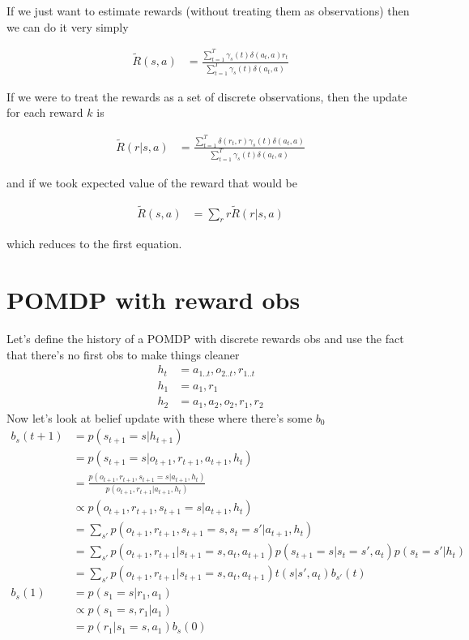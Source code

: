 \documentclass[10pt,english]{article}
\begin{document}
If we just want to estimate rewards (without treating them as observations) then we can do it very simply

\begin{align}
\tilde{R}(s,a) &= \frac{\sum_{t=1}^{T}\gamma_{s}(t)\delta(a_t,a) r_t}{\sum_{t=1}^{T}\gamma_{s}(t)\delta(a_t,a)}
\end{align}

If we were to treat the rewards as a set of discrete observations, then the update for each reward $k$ is

\begin{align}
\tilde{R}(r|s,a) &= \frac{\sum_{t=1}^{T}\delta(r_t,r) \gamma_{s}(t)\delta(a_t,a)}{\sum_{t=1}^{T}\gamma_{s}(t)\delta(a_t,a)}
\end{align}

and if we took expected value of the reward that would be

\begin{align}
\tilde{R}(s,a) &= \sum_r r\tilde{R}(r|s,a)
\end{align}

which reduces to the first equation.

\section{POMDP with reward obs}

Let's define the history of a POMDP with discrete rewards obs and use the fact that there's no first obs to make things cleaner
\begin{align}
h_t &= a_{1..t},o_{2..t},r_{1..t} \\
h_1 &= a_1,r_1 \\
h_2 &= a_1,a_2,o_2,r_1,r_2
\end{align}
Now let's look at belief update with these where there's some $b_0$
\begin{align}
b_s(t+1) &= p(s_{t+1}=s|h_{t+1}) \\
&= p(s_{t+1}=s|o_{t+1},r_{t+1},a_{t+1},h_{t}) \\
&= \frac{p(o_{t+1},r_{t+1},s_{t+1}=s|a_{t+1},h_{t})}{p(o_{t+1},r_{t+1}|a_{t+1},h_{t})} \\
&\propto {p(o_{t+1},r_{t+1},s_{t+1}=s|a_{t+1},h_{t})} \\
&= \sum_{s'} p(o_{t+1},r_{t+1},s_{t+1}=s,s_t=s'|a_{t+1},h_{t}) \\
&= \sum_{s'} p(o_{t+1},r_{t+1}|s_{t+1}=s,a_t,a_{t+1}) p(s_{t+1}=s|s_t=s',a_{t}) p(s_t=s'|h_{t})\\
&= \sum_{s'} p(o_{t+1},r_{t+1}|s_{t+1}=s,a_t,a_{t+1}) t(s|s',a_t) b_{s'}(t) \\
b_s(1) &= p(s_{1}=s|r_{1},a_{1}) \\
&\propto p(s_{1}=s,r_{1}|a_{1}) \\
&= p(r_{1}|s_{1}=s,a_{1})b_s(0)
\end{align}
\end{document}
